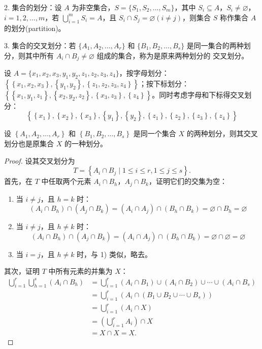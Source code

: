 \documentclass[normal,cyan]{elegantnote}
\begin{document}
2. 集合的划分：设 $A$ 为非空集合，$S = \{S_1, S_2, \dots, S_m\}$，其中 $S_i \subseteq A$，$S_i \neq \varnothing$，$i = 1, 2, \dots, m$，若 $\bigcup\limits_{i = 1}^m S_i = A$，且 $S_i \cap S_j = \varnothing(i \neq j)$，则集合 $S$ 称作集合 $A$ 的{\color{red}划分}(partition)。

3. 集合的交叉划分：若 $\{A_1, A_2, \dots, A_r\}$ 和 $\{B_1, B_2, \dots, B_s\}$ 是同一集合的两种划分，则其中所有 $A_i \cap B_j \neq \varnothing$ 组成的集合，称为是原来两种划分的{\color{red} 交叉划分}。
\begin{example}
    设 $A = \{x_1, x_2, x_3, y_1, y_2, z_1, z_2, z_3, z_4\}$，按字母划分：$\left\{\left\{x_1, x_2, x_3\right\},\left\{y_1, y_2\right\},\left\{z_1, z_2, z_3, z_4\right\}\right\}$；按下标划分：$\left\{\left\{x_1, y_1, z_1\right\},\left\{x_2, y_2, z_2\right\},\left\{x_3, z_3\right\}, \left\{z_4\right\}\right\}$。同时考虑字母和下标得交叉划分：$$\left\{\left\{x_1\right\}, \left\{x_2\right\}, \left\{x_3\right\}, \left\{y_1\right\}, \left\{y_2\right\}, \left\{z_1\right\}, \left\{z_2\right\}, \left\{z_3\right\}, \left\{z_4\right\}\right\}$$
\end{example}
\begin{theorem}
    设 $\left\{A_1, A_2, \dots, A_r\right\}$ 和 $\left\{B_1, B_2, \dots, B_s\right\}$ 是同一个集合 $X$ 的两种划分，则其交叉划分也是原集合 $X$ 的一种划分。
\end{theorem}
\begin{proof}
    设其交叉划分为 $$T = \left\{A_i \cap B_j \mid 1 \leq i \leq r, 1 \leq j \leq s\right\}.$$ 首先，在 $T$ 中任取两个元素 $A_i \cap B_h$，$A_j \cap B_k$，证明它们的交集为空：
    \begin{enumerate}[1)]
        \item 当 $i \neq j$，且 $h = k$ 时：$$(A_i \cap B_h) \cap (A_j \cap B_k) = (A_i \cap A_j) \cap (B_h \cap B_k) = \varnothing \cap B_h = \varnothing$$
        \item 当 $i \neq j$，且 $h \neq k$ 时：$$(A_i \cap B_h) \cap (A_j \cap B_k) = (A_i \cap A_j) \cap (B_h \cap B_k) = \varnothing \cap \varnothing = \varnothing$$
        \item 当 $i = j$，且 $h \neq k$ 时，与 1) 类似，略去。
    \end{enumerate}
    其次，证明 $T$ 中所有元素的并集为 $X$：
    $$\begin{aligned}\bigcup\limits_{i = 1}^r\bigcup\limits_{h = 1}^s(A_i \cap B_h) &= \bigcup\limits_{i = 1}^r(A_i \cap B_1)\cup(A_i\cap B_2)\cup\cdots\cup(A_i \cap B_s) \\
    &= \bigcup\limits_{i = 1}^r\left(A_i \cap (B_1\cup B_2 \cup \cdots \cup B_s)\right) \\
    &= \bigcup\limits_{i = 1}^r (A_i \cap X) \\
    &= \left(\bigcup\limits_{i = 1}^r A_i\right) \cap X \\
    &= X \cap X = X.\end{aligned}$$
\end{proof}
\end{document}
